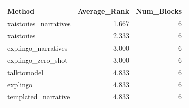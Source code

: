 \begin{tabular}{lrr}
\toprule
Method & Average_Rank & Num_Blocks \\
\midrule
xaistories_narratives & 1.667 & 6 \\
xaistories & 2.333 & 6 \\
explingo_narratives & 3.000 & 6 \\
explingo_zero_shot & 3.000 & 6 \\
talktomodel & 4.833 & 6 \\
explingo & 4.833 & 6 \\
templated_narrative & 4.833 & 6 \\
\bottomrule
\end{tabular}
